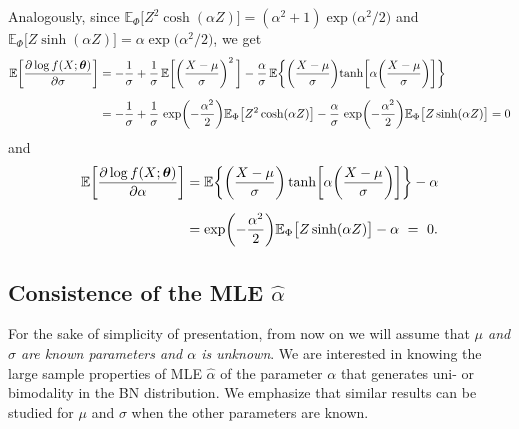 \documentclass[12pt]{article}
\theoremstyle{definition}
\begin{document}
Analogously, since $
\mathbb{E}_{\Phi}\big[Z^2 \cosh(\alpha Z) \big]=(\alpha^2+1)\exp\big({\alpha^2/ 2}\big)$ and $\mathbb{E}_{\Phi}
\big[Z\sinh(\alpha Z)\big]=\alpha\exp\big({\alpha^2/ 2}\big)$, we get
\begin{align*}
\mathbb{E}\biggl[{\partial \log f(X;\boldsymbol{\theta})\over \partial \sigma }\biggr]
&=
-{1\over\sigma}
+
{1\over \sigma}\, \mathbb{E}\biggl[\biggl({X-\mu\over \sigma}\biggl)^2\, \biggr]
-
{\alpha\over\sigma}\, \mathbb{E}\biggl\{ \biggl({X-\mu\over \sigma}\biggl) {\rm tanh}\biggl[\alpha\biggl({X-\mu\over \sigma}\bigg)\biggr]\biggr\}
\\[0,2cm]
&=
-{1\over\sigma}
+
{1\over \sigma}\, \exp\biggl(-{\alpha^2\over 2}\biggr)
\mathbb{E}_{\Phi}\big[Z^2 \cosh(\alpha Z) \big]
-
{\alpha\over\sigma}\, 
\exp\biggl(-{\alpha^2\over 2}\biggr)
\mathbb{E}_{\Phi}
\big[Z\sinh(\alpha Z)\big]
=0
\end{align*}
and
\begin{align}\label{exp=10}
\mathbb{E}\biggl[{\partial \log f(X;\boldsymbol{\theta})\over \partial \alpha }\biggr]
&=
\mathbb{E}
\biggl\{\biggl({ X-\mu\over \sigma}\biggr)
\tanh\biggl[\alpha\biggl({ X-\mu\over \sigma}\biggr)\biggr]\biggr\}
-\alpha \nonumber
\\[0,2cm]
&=
\exp\biggl(-{\alpha^2\over 2}\biggr)
\mathbb{E}_{\Phi}
\big[Z\sinh(\alpha Z)\big]
-\alpha
\ = \ 
0.
\end{align}



\subsection{Consistence of the MLE $\widehat{\alpha}$}
For the sake of simplicity of presentation, from now on we will assume that {\it $\mu$ and $\sigma$ are known parameters and $\alpha$ is unknown}. We are interested in knowing the large sample properties of  MLE $\widehat{\alpha}$ of the parameter $\alpha$ that generates uni- or bimodality in the BN distribution. We emphasize that similar results can be studied for $\mu$ and $\sigma$ when the other parameters are known.
\end{document}

